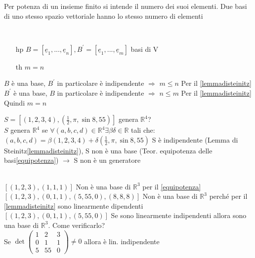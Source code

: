 \begin{teorema}\label{equipotenza}
	Per potenza di un insieme finito si intende il numero dei suoi elementi. Due basi di uno stesso spazio vettoriale hanno lo stesso numero di elementi
	\begin{dimostrazione}
		\phantom{}\\
		\begin{itemize}
			\item[hp] $B=[\underline{e}_1,...,\underline{e}_n], B^{'}=[\underline{e}_1,...,\underline{e}_m]$ basi di V
			\item[th] $m=n$
		\end{itemize}
		$B$ è una base, $B^{'}$ in particolare è indipendente $\Longrightarrow$ $m\leqslant n$ Per il \ref{lemmadisteinitz}\\
		$B^{'}$ è una base, $B$ in particolare è indipendente $\Longrightarrow$ $n\leqslant m$ Per il \ref{lemmadisteinitz}\\
		Quindi $m=n$
	\end{dimostrazione}
	\begin{esercizio}
		$S=[(1,2,3,4),(\frac{1}{2},\pi,\sin 8, 55)]$ genera $\mathbb{R}^4$?\\
		$S$ genera $\mathbb{R}^4$ se $\forall(a,b,c,d)\in\mathbb{R}^4\exists\beta\delta\in\mathbb{R}$ tali che:\\ 
		$(a,b,c,d)=\beta(1,2,3,4)+\delta(\frac{1}{2},\pi,\sin 8, 55)$
		S è indipendente (Lemma di Steinitz\ref{lemmadisteinitz}), S non è una base (Teor. equipotenza delle basi\ref{equipotenza}) $\longrightarrow$ S non è un generatore
	\end{esercizio}
	\begin{osservazione}
		\phantom{}\\
		$[(1,2,3),(1,1,1)]$ Non è una base di $\mathbb{R}^3$ per il \ref{equipotenza}\\
		$[(1,2,3),(0,1,1),(5,55,0),(8,8,8)]$ Non è una base di $\mathbb{R}^3$ perché per il \ref{lemmadisteinitz} sono linearmente dipendenti\\
		$[(1,2,3),(0,1,1),(5,55,0)]$ Se sono linearmente indipendenti allora sono una base di $\mathbb{R}^3$. Come verificarlo?\\
		Se $\det\begin{pmatrix}
			1 & 2 & 3\\
			0 & 1 & 1\\
			5 & 55& 0
		\end{pmatrix}\neq 0$ allora è lin. indipendente
	\end{osservazione}
\end{teorema}

